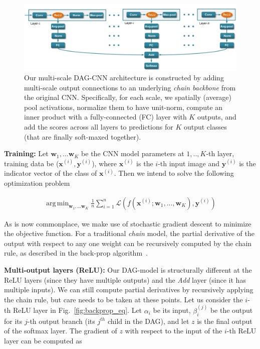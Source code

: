 \documentclass[10pt,twocolumn,letterpaper]{article}
\DeclareMathOperator*{\argmin}{arg\,min}
\begin{document}
\begin{figure}[t!]
\centering
	\includegraphics[width=\textwidth]{fig/fig_model.png}
\caption{Our multi-scale DAG-CNN architecture is constructed by adding multi-scale output connections to an underlying {\em chain backbone} from the original CNN. Specifically, for each scale, we spatially (average) pool activations, normalize them to have unit-norm, compute an inner product with a fully-connected (FC) layer with $K$ outputs, and add the scores across all layers to predictions for $K$ output classes (that are finally soft-maxed together).}
\label{fig:model}
\end{figure}

{\bf Training:} Let $\textbf{w}_1,...\textbf{w}_K$ be the CNN model parameters at $1,..,K$-th layer, training data be ($\textbf{x}^{(i)},\textbf{y}^{(i)}$), where $\textbf{x}^{(i)}$ is the $i$-th input image and $\textbf{y}^{(i)}$ is the indicator vector of the class of $\textbf{x}^{(i)}$. Then we intend to solve the following optimization problem

\begin{align}
\argmin_{\textbf{w}_1,...\textbf{w}_K} \frac{1}{n}\sum_{i=1}^{n} \mathcal{L}(f(\textbf{x}^{(i)};\textbf{w}_1,...,\textbf{w}_K),\textbf{y}^{(i)})
\end{align}

As is now commonplace, we make use of stochastic gradient descent to minimize the objective function. For a traditional \textit{chain} model, the partial derivative of the output with respect to any one weight can be recursively computed by the chain rule, as described in the back-prop algorithm~\cite{rumelhart1988learning}. 

{\bf Multi-output layers (ReLU):} Our DAG-model is structurally different at the ReLU layers (since they have multiple outputs) and the \textit{Add} layer (since it has multiple inputs). We can still compute partial derivatives by recursively applying the chain rule, but care needs to be taken at these points. Let us consider the $i$-th ReLU layer in Fig.~\ref{fig:backprop_eq}. Let $\alpha_i$ be its input, $\beta_i^{(j)}$ be the output for its $j$-th output branch (its $j^{th}$ child in the DAG), and let $z$ is the final output of the softmax layer. The gradient of $z$ with respect to the input of the $i$-th ReLU layer can be computed as
\end{document}
